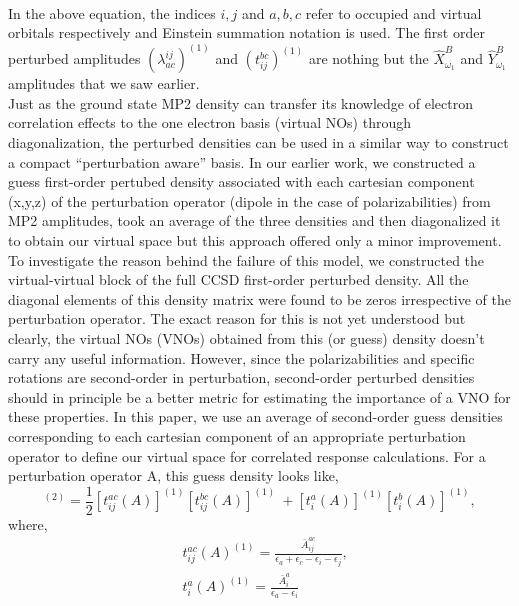 \\
In the above equation, the indices $i,j$ and $a,b,c$ refer to occupied and virtual orbitals respectively
and Einstein summation notation is used. The first order perturbed amplitudes $(\lambda^{ij}_{ac})^{(1)}$ 
and $(t^{bc}_{ij})^{(1)}$ are nothing but the $\hat{X}^{B}_{\omega_1}$ and $\hat{Y}^{B}_{\omega_1}$ 
amplitudes that we saw earlier.\\ Just as the ground state MP2 density can transfer its knowledge of 
electron correlation effects to the one electron basis (virtual NOs) through diagonalization, 
the perturbed densities can be used in a similar way to construct a compact ``perturbation aware''
basis. In our earlier work, we constructed a guess first-order pertubed density associated  
with each cartesian component (x,y,z) of the perturbation operator (dipole in the case of polarizabilities)
from MP2 amplitudes, took an average of the three densities and then diagonalized it to obtain our 
virtual space but this approach offered only a minor improvement\cite{Kumar17}.
To investigate the reason behind the failure of this model, we constructed the virtual-virtual
block of the full CCSD first-order perturbed density. All the diagonal elements of this density 
matrix were found to be zeros irrespective of the perturbation operator. The exact reason for this
is not yet understood but clearly, the virtual NOs (VNOs) obtained from this (or guess) density 
doesn't carry any useful information. However, since the polarizabilities and specific rotations are 
second-order in perturbation, second-order perturbed densities should in principle be a better 
metric for estimating the importance of a VNO for these properties.
In this paper, we use an average of second-order guess densities corresponding to each cartesian
component of an appropriate perturbation operator to define our virtual space 
for correlated response calculations. For a perturbation operator A, this guess density looks like,
\\
\begin{equation}
[{D^A_{ab}}]^{(2)} = \frac{1}{2}[t^{ac}_{ij}(A)]^{(1)}[t^{bc}_{ij}(A)]^{(1)} \
+ [t^{a}_{i}(A)]^{(1)} [t^{b}_{i}(A)]^{(1)}, 
\end{equation}
where,
\begin{equation}
\begin{split}
& t^{ac}_{ij}(A)^{(1)} = \frac{\bar{A}^{ac}_{ij}}{\epsilon_a + \epsilon_c - \epsilon_i - \epsilon_j},\\
& t^{a}_{i}(A)^{(1)} = \frac{\bar{A}^{a}_{i}}{\epsilon_a - \epsilon_i}\\
\end{split}
\end{equation}
